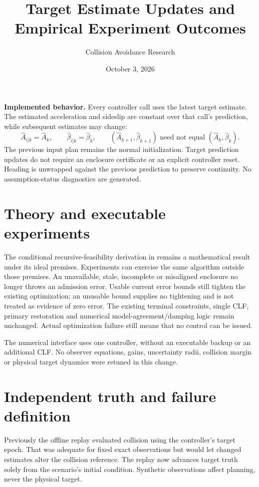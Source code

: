 \documentclass[11pt]{article}
\title{Target Estimate Updates and Empirical Experiment Outcomes}
\author{Collision Avoidance Research}
\date{October 3, 2026}
\begin{document}
\maketitle

\textbf{Implemented behavior.} Every controller call uses the latest target
estimate. The estimated acceleration and sideslip are constant over that
call's prediction, while subsequent estimates may change:
\[
 \widehat A_{i|k}=\widehat A_k,\qquad
 \widehat\beta_{i|k}=\widehat\beta_k,\qquad
 (\widehat A_{k+1},\widehat\beta_{k+1})
 \text{ need not equal }(\widehat A_k,\widehat\beta_k).
\]
The previous input plan remains the normal initialization. Target prediction
updates do not require an enclosure certificate or an explicit controller
reset. Heading is unwrapped against the previous prediction to preserve
continuity. No assumption-status diagnostics are generated.

\section{Theory and executable experiments}
The conditional recursive-feasibility derivation in
 remains a mathematical result
under its ideal premises. Experiments can exercise the same algorithm outside
those premises. An unavailable, stale, incomplete or misaligned enclosure no
longer throws an admission error. Usable current error bounds still tighten
the existing optimization; an unusable bound supplies no tightening and is
not treated as evidence of zero error. The existing terminal constraints,
single CLF, primary restoration and numerical model-agreement/damping logic
remain unchanged. Actual optimization failure still means that no control
can be issued.

The numerical interface uses one controller, without an executable backup or
an additional CLF. No observer equations, gains, uncertainty radii, collision
margin or physical target dynamics were retuned in this change.

\section{Independent truth and failure definition}
Previously the offline replay evaluated collision using the controller's
target epoch. That was adequate for fixed exact observations but would let
changed estimates alter the collision reference. The replay now advances
target truth solely from the scenario's initial condition. Synthetic
observations affect planning, never the physical target.
\end{document}
